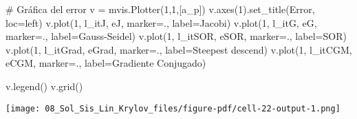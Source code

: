 \documentclass[
  letterpaper,
  DIV=11,
  numbers=noendperiod]{scrreprt}
\newenvironment{Shaded}{\begin{snugshade}}{\end{snugshade}}
\newcommand{\CommentTok}[1]{\textcolor[rgb]{0.37,0.37,0.37}{#1}}
\newcommand{\DecValTok}[1]{\textcolor[rgb]{0.68,0.00,0.00}{#1}}
\newcommand{\NormalTok}[1]{\textcolor[rgb]{0.00,0.23,0.31}{#1}}
\newcommand{\OperatorTok}[1]{\textcolor[rgb]{0.37,0.37,0.37}{#1}}
\newcommand{\StringTok}[1]{\textcolor[rgb]{0.13,0.47,0.30}{#1}}
\begin{document}
\begin{Shaded}
\begin{Highlighting}[]
\CommentTok{\# Gráfica del error}
\NormalTok{v }\OperatorTok{=}\NormalTok{ mvis.Plotter(}\DecValTok{1}\NormalTok{,}\DecValTok{1}\NormalTok{,[a\_p]) }
\NormalTok{v.axes(}\DecValTok{1}\NormalTok{).set\_title(}\StringTok{\textquotesingle{}Error\textquotesingle{}}\NormalTok{, loc}\OperatorTok{=}\StringTok{\textquotesingle{}left\textquotesingle{}}\NormalTok{)}
\NormalTok{v.plot(}\DecValTok{1}\NormalTok{, l\_itJ, eJ, marker}\OperatorTok{=}\StringTok{\textquotesingle{}.\textquotesingle{}}\NormalTok{, label}\OperatorTok{=}\StringTok{\textquotesingle{}Jacobi\textquotesingle{}}\NormalTok{)}
\NormalTok{v.plot(}\DecValTok{1}\NormalTok{, l\_itG, eG, marker}\OperatorTok{=}\StringTok{\textquotesingle{}.\textquotesingle{}}\NormalTok{, label}\OperatorTok{=}\StringTok{\textquotesingle{}Gauss{-}Seidel\textquotesingle{}}\NormalTok{)}
\NormalTok{v.plot(}\DecValTok{1}\NormalTok{, l\_itSOR, eSOR, marker}\OperatorTok{=}\StringTok{\textquotesingle{}.\textquotesingle{}}\NormalTok{, label}\OperatorTok{=}\StringTok{\textquotesingle{}SOR\textquotesingle{}}\NormalTok{)}
\NormalTok{v.plot(}\DecValTok{1}\NormalTok{, l\_itGrad, eGrad, marker}\OperatorTok{=}\StringTok{\textquotesingle{}.\textquotesingle{}}\NormalTok{, label}\OperatorTok{=}\StringTok{\textquotesingle{}Steepest descend\textquotesingle{}}\NormalTok{)}
\NormalTok{v.plot(}\DecValTok{1}\NormalTok{, l\_itCGM, eCGM, marker}\OperatorTok{=}\StringTok{\textquotesingle{}.\textquotesingle{}}\NormalTok{, label}\OperatorTok{=}\StringTok{\textquotesingle{}Gradiente Conjugado\textquotesingle{}}\NormalTok{)}

\NormalTok{v.legend()}
\NormalTok{v.grid()}
\end{Highlighting}
\end{Shaded}

\texttt{[image: 08\_Sol\_Sis\_Lin\_Krylov\_files/figure-pdf/cell-22-output-1.png]}
\end{document}
